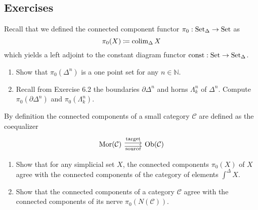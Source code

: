 \begin{comment}
\[
\text{pushout:}
\begin{tikzcd}
    \Delta^0=\Delta^{\{1\}}
    \arrow[r,hook]
    \arrow[d,hook]
    &
    \Delta^{\{0,1\}}
    \arrow[d,"01"]
    \arrow[rdd,bend left]
    &
    &
    \\
    \Delta^{\{1,2\}}
    \arrow[rrd, bend right]
    \arrow[r, "12"]
    &
    \Lambda^2_1
    \arrow[rd,dashed,"\exists!"]
    &
    &
    \\
    &
    &
    X
\end{tikzcd}
\]

\todo{fill in the missing}
\end{comment}

\subsection{Exercises}

\begin{Exercise}
    Recall that we defined the connected component functor $ \pi_0 : \operatorname{Set}_{\Delta} \to \operatorname{Set} $ as 
    \[
        \pi_0 ( X ) \coloneqq \operatorname{colim}_{ \Delta } X 
    \]
    which yields a left adjoint to the constant diagram functor $ \operatorname{const} : \operatorname{Set} \to \operatorname{Set}_{\Delta} $.
    
    \begin{enumerate}[label=(\alph*)]
        
        \item 
        Show that $ \pi_0 ( \Delta^n ) $ is a one point set for any $ n \in \mathbb{ N } $.
    
        \item 
        Recall from Exercise 6.2 the boundaries $ \partial \Delta^n $ and horns $ \Lambda_k^n $ of $ \Delta^n $.
        Compute $ \pi_0 ( \partial \Delta^n ) $ and $ \pi_0 ( \Lambda_k^n ) $. 
    \end{enumerate}
    
    By definition the connected components of a small category $ \mathcal{ C }$ are defined as the coequalizer 
    \[
        \begin{tikzcd}
        \Mor ( \mathcal{ C } ) 
        \ar[r, shift left, "\text{target}"]
        \ar[r, shift right, "\text{source}"']
        &
        \Ob( \mathcal{ C } )
        \end{tikzcd}
    \]
    
    \begin{enumerate}[label=(\alph*), resume]
       
        \item 
        Show that for any simplicial set $ X $, the connected components $ \pi_0 ( X ) $ of $ X $ agree with the connected components of the category of elements $ \int^{ \Delta } X $.
    
        \item 
        Show that the connected components of a category $ \mathcal{ C } $ agree with the connected components of its nerve $ \pi_0 ( N ( \mathcal{ C } ) )$.
        
    \end{enumerate}
\end{Exercise}

